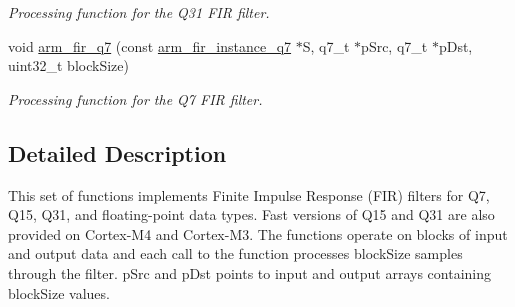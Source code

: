 \begin{DoxyCompactItemize}
\begin{DoxyCompactList}\small\item\em Processing function for the Q31 F\-I\-R filter. \end{DoxyCompactList}\item 
void \hyperlink{group___f_i_r_ga31c91a0bf0962327ef8f626fae68ea32}{arm\-\_\-fir\-\_\-q7} (const \hyperlink{structarm__fir__instance__q7}{arm\-\_\-fir\-\_\-instance\-\_\-q7} $\ast$S, q7\-\_\-t $\ast$p\-Src, q7\-\_\-t $\ast$p\-Dst, uint32\-\_\-t block\-Size)
\begin{DoxyCompactList}\small\item\em Processing function for the Q7 F\-I\-R filter. \end{DoxyCompactList}\end{DoxyCompactItemize}


\subsection{Detailed Description}
This set of functions implements Finite Impulse Response (F\-I\-R) filters for Q7, Q15, Q31, and floating-\/point data types. Fast versions of Q15 and Q31 are also provided on Cortex-\/\-M4 and Cortex-\/\-M3. The functions operate on blocks of input and output data and each call to the function processes {\ttfamily block\-Size} samples through the filter. {\ttfamily p\-Src} and {\ttfamily p\-Dst} points to input and output arrays containing {\ttfamily block\-Size} values.

